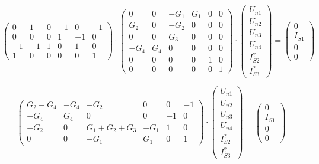 {\[
   \begin{pmatrix}
      0 & 1 & 0 & -1 & 0 & -1 \\
      0 & 0 & 0 & 1 & -1 & 0  \\
      -1 & -1 & 1 & 0 & 1 & 0 \\
      1 & 0 & 0 & 0 & 0 & 1  
   \end{pmatrix}
   \cdot
   \begin{pmatrix}
      0 & 0 & -G_1 & G_1 & 0 & 0 \\
      G_2 & 0 & -G_2 & 0 & 0 & 0 \\
      0 & 0 & G_3 & 0 & 0 & 0 \\
      -G_4 & G_4 & 0 & 0 & 0 & 0\\
      0 & 0 & 0 & 0 & 1 & 0 \\
      0 & 0 & 0 & 0 & 0 & 1 
   \end{pmatrix}
   \cdot
   \begin{pmatrix}
      U_{n1} \\ U_{n2} \\ U_{n3} \\ U_{n4} \\ I_{S2}^? \\ I_{S3}^?
   \end{pmatrix}
   =
   \begin{pmatrix}
      0 \\ I_{S1} \\ 0 \\ 0  
   \end{pmatrix}
\]
\hspace{2cm}

\begin{equation}
\begin{pmatrix}
   G_2 + G_4 & -G_4 & -G_2 & 0 & 0 & -1 \\
   -G_4 & G_4 & 0 & 0 & -1 & 0 \\
   -G_2 & 0 & G_1+G_2+G_3 & -G_1 & 1 & 0 \\
   0 & 0 & -G_1 & G_1 & 0 & 1 
\end{pmatrix}
\cdot
\begin{pmatrix}
   U_{n1} \\ U_{n2} \\ U_{n3} \\ U_{n4} \\ I_{S2}^? \\ I_{S3}^?
\end{pmatrix}
=
\begin{pmatrix}
   0 \\ I_{S1} \\ 0 \\ 0  
\end{pmatrix}
\label{eqn:nodes_currents}
\end{equation}

}
